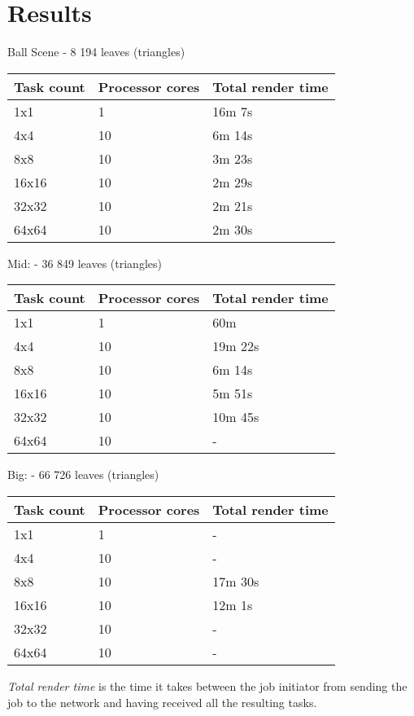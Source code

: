 \chapter{Results}

\begin{center}
    Ball Scene - 8 194 leaves (triangles)
    \begin{tabular}{ | l | l | l |} \hline
    Task count & Processor cores & Total render time \\ \hline
    1x1 & 1 & 16m 7s\\ \hline
    4x4 & 10 & 6m 14s \\ \hline
    8x8 & 10 & 3m 23s \\ \hline
    16x16 & 10 & 2m 29s \\ \hline
    32x32 & 10 & 2m 21s \\ \hline
    64x64 & 10 & 2m 30s \\ \hline
    \end{tabular}
    
    Mid:    - 36 849 leaves (triangles)
    \begin{tabular}{ | l | l | l |} \hline
    Task count & Processor cores & Total render time \\ \hline
    1x1 & 1 & 60m\\ \hline
    4x4 & 10 & 19m 22s \\ \hline
    8x8 & 10 & 6m 14s \\ \hline
    16x16 & 10 & 5m 51s \\ \hline
    32x32 & 10 & 10m 45s \\ \hline
    64x64 & 10 & - \\ \hline
    \end{tabular}
    
    Big:    - 66 726 leaves (triangles)
    \begin{tabular}{ | l | l | l |} \hline
    Task count & Processor cores & Total render time \\ \hline
    1x1 & 1 & - \\ \hline
    4x4 & 10 & - \\ \hline
    8x8 & 10 & 17m 30s \\ \hline
    16x16 & 10 & 12m 1s \\ \hline
    32x32 & 10 & - \\ \hline
    64x64 & 10 & - \\ \hline
    \end{tabular}
    
    \emph{Total render time} is the time it takes between the job initiator from sending the job to the network and having received all the resulting tasks.
\end{center}

